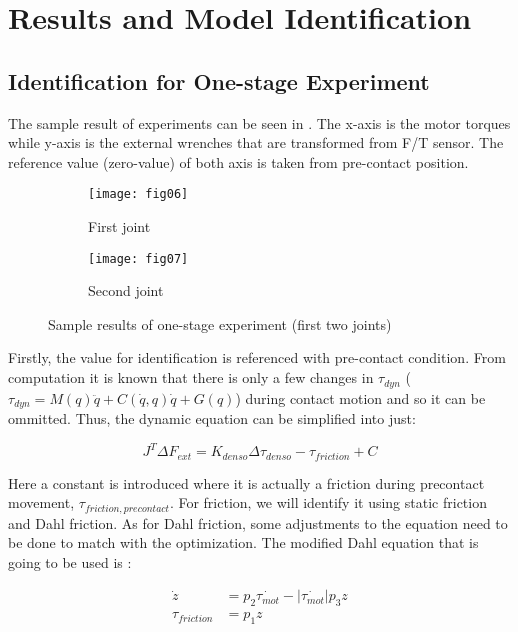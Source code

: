 \chapter{Results and Model Identification}
\section{Identification for One-stage Experiment}

The sample result of experiments can be seen in . The x-axis is the motor torques while y-axis is the external wrenches that are transformed from F/T sensor. The reference value (zero-value) of both axis is taken from pre-contact position. 

\begin{figure}[H]
  \begin{subfigure}[t]{0.5\textwidth}
    \centering
    \texttt{[image: fig06]} 
    \caption{First joint}
  \end{subfigure}
  \begin{subfigure}[t]{0.5\textwidth}
    \centering
    \texttt{[image: fig07]}
    \caption{Second joint}
  \end{subfigure}
  \caption{Sample results of one-stage experiment (first two joints)}
  \label{fig:one-stage}
\end{figure}

Firstly, the value for identification is referenced with pre-contact condition. From computation it is known that there is only a few changes in $\tau_{dyn}$ ($\tau_{dyn} = M\left(q\right)\ddot{q} + C\left(\dot{q} , q \right)\dot{q} + G\left(q \right)$) during contact motion and so it can be ommitted. Thus, the dynamic equation can be simplified into just:

\begin{equation}
  J^{T} \Delta F_{ext} = K_{denso} \Delta \tau_{denso} - \tau_{friction} + C
\end{equation}
 
Here a constant is introduced where it is actually a friction during precontact movement, $\tau_{friction,precontact}$. For friction, we will identify it using static friction and Dahl friction. As for Dahl friction, some adjustments to the equation need to be done to match with the optimization. The modified Dahl equation that is going to be used is : 

\begin{align}
  \dot{z} &= p_{2 }\dot{\tau_{mot}} - \left|\dot{\tau_{mot}}\right| p_{3} z \\
  \tau_{friction} &= p_{1} z
\end{align}

